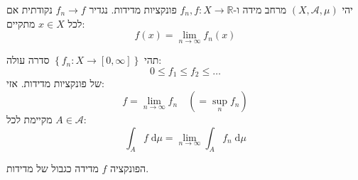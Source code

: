 \documentclass{tstextbook}
\begin{document}
\begin{definition}
יהי \(\left( X,\mathcal{A},\mu \right)\) מרחב מידה ו-\(f_{n},f:X\to \mathbb{R}\) פונקציות מדידות. נגדיר \(f_{n}\to f\) נקודתית אם לכל \(x \in X\) מתקיים:
$$f(x)=\lim_{ n \to \infty } f_{n}(x)$$

\end{definition}
\begin{theorem}
תהי \(\left\{  f_{n}:X\to \left[ 0,\infty \right]  \right\}\) סדרה עולה:
$$0\leq f_{1} \leq f_{2} \leq \dots$$
של פונקציות מדידות. אזי:
$$f=\lim_{ n \to \infty } f_{n}\quad \left( =\sup _{n}f_{n} \right)$$
מקיימת לכל \(A \in \mathcal{A}\):
$$\int_{A}f \;\mathrm{d}\mu = \lim_{ n \to \infty } \int_{A}f_{n}\;\mathrm{d}\mu$$

\end{theorem}
\begin{remark}
הפונקציה \(f\) מדידה כגבול של מדידות.

\end{remark}
\end{document}
